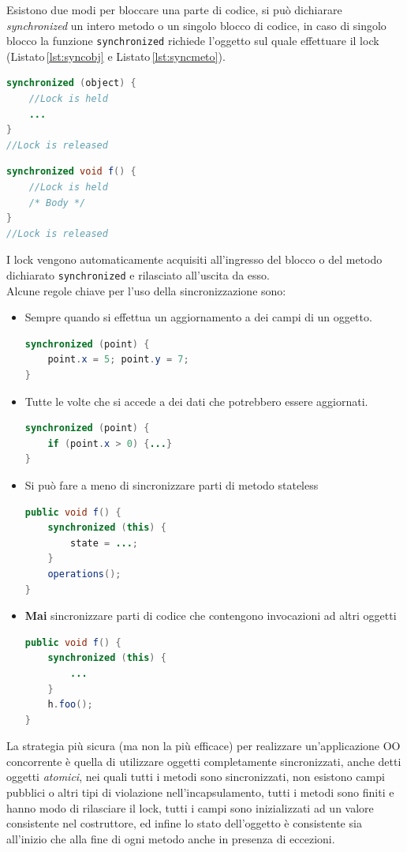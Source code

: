 Esistono due modi per bloccare una parte di codice, si può dichiarare \emph{synchronized} un intero metodo o un singolo blocco di codice, in caso di singolo blocco la funzione \texttt{synchronized} richiede l'oggetto sul quale effettuare il lock (Listato\,\ref{lst:syncobj} e Listato\,\ref{lst:syncmeto}).\\
\pagebreak
\begin{lstlisting}[language=Java,caption={Sincronizzazione di una parte di codice},label=lst:syncobj]
synchronized (object) {
	//Lock is held
	...
}
//Lock is released
\end{lstlisting}
\begin{lstlisting}[language=Java,caption={Sincronizzazione di un metodo},label=lst:syncmeto]
synchronized void f() {
	//Lock is held
	/* Body */
}
//Lock is released
\end{lstlisting}
I lock vengono automaticamente acquisiti all'ingresso del blocco o del metodo dichiarato \texttt{synchronized} e rilasciato all'uscita da esso.\\
Alcune regole chiave per l'uso della sincronizzazione sono:
\begin{itemize}
\item Sempre quando si effettua un aggiornamento a dei campi di un oggetto.
\begin{lstlisting}[language=Java]
synchronized (point) {
	point.x = 5; point.y = 7;
}
\end{lstlisting}
\item Tutte le volte che si accede a dei dati che potrebbero essere aggiornati.
\begin{lstlisting}[language=Java]
synchronized (point) {
	if (point.x > 0) {...}
}
\end{lstlisting}
\item Si può fare a meno di sincronizzare parti di metodo stateless
\begin{lstlisting}[language=Java]
public void f() {
	synchronized (this) {
		state = ...;
	}
	operations();
}
\end{lstlisting}
\item \textbf{Mai} sincronizzare parti di codice che contengono invocazioni ad altri oggetti
\begin{lstlisting}[language=Java]
public void f() {
	synchronized (this) {
		...
	}
	h.foo();
}
\end{lstlisting}
\end{itemize}
La strategia più sicura (ma non la più efficace) per realizzare un'applicazione OO concorrente è quella di utilizzare oggetti completamente sincronizzati, anche detti oggetti \emph{atomici}, nei quali tutti i metodi sono sincronizzati, non esistono campi pubblici o altri tipi di violazione nell'incapsulamento, tutti i metodi sono finiti e hanno modo di rilasciare il lock, tutti i campi sono inizializzati ad un valore consistente nel costruttore, ed infine lo stato dell'oggetto è consistente sia all'inizio che alla fine di ogni metodo anche in presenza di eccezioni.\\
